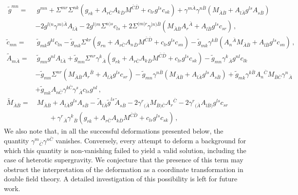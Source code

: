 \documentclass[12pt, utf8]{article}
\numberwithin{equation}{section}
\begin{document}
\begin{equation}  \label{deformation rules GDFT }
    \begin{aligned}
       \ \tilde{g}^{mn} =&\ g^{mn} + \Sigma^{mr} \Sigma^{nk} (g_{rk} + A_{r\bar{C}}A_k{}_{\bar{D}} M^{\bar{C}\bar{D}} +c_{lr}g^{ls}c_{sk} )  + \gamma^{m \bar{A}} \gamma^{n \bar{B}} (M_{\bar{A} \bar{B}} + A_{l \bar{A}} g^{ls}A_{s \bar{B}}) \\
        &  -  2 g^{l(n} \gamma^{m) \bar{A}} A_{l\bar{A}} - 2 g^{l(m} \Sigma^{n)s}c_{ls} + 2 \Sigma^{(m|r} \gamma^{|n)\bar{B}} (M_{\bar{A} \bar{B}} A_{r}{}^{\bar{A}} + A_{l\bar{B}} g^{ls}c_{sr}) \, ,\\
            \tilde{c}_{m n} =&\ \tilde{g}_{m k} g^{k l}c_{ln} - \tilde{g}_{m k} \Sigma^{k r} (g_{rn} + A_{r \bar{C}} A_n{}_{\bar{D}} M^{\bar{C}\bar{D}} + c_{lr}g^{ls}c_{sn}) - \tilde{g}_{m k} \gamma^{k \bar{B}} (A_n{}^{\bar{A}} M_{\bar{A} \bar{B}} +A_{l \bar{B}} g^{ls} c_{sn}) \, , \\     
            \tilde{A}_{m \bar{A}} =&\   \tilde{g}_{m n}  g^{n l}A_{l\bar{A}} +  \tilde{g}_{m n}  \Sigma^{nr} \gamma^{k}{}_{\bar{A}} (g_{rk}+A_{r \bar{C}} A_k{}_{\bar{D}} M^{\bar{C} \bar{D}} +c_{lr}g^{ls}c_{sk})  -  \tilde{g}_{m n}  \gamma^k{}_{\bar{A}}  g^{nl}c_{lk} \\ 
        &  -  \tilde{g}_{m n} \Sigma^{n r}(M_{\bar{A} \bar{B}} A_{r}{}^{ \bar{B}}  + A_{l \bar{A}}g^{ls}c_{sr}) -  \tilde{g}_{m n}  \gamma^{n\bar{B}} (M_{\bar{A} \bar{B}} + A_{l \bar{A} } g^{ls} A_{s \bar{B}}) + \tilde{g}_{m k} \gamma^{k \bar{B}} A_{n}{}^{\bar{C}} M_{\bar{B} \bar{C}} \gamma^{n}{}_{\bar{A}} \\ 
        &  + \tilde{g}_{m k} A_{n \bar{C}} \gamma^{k \bar{C}} \gamma^{s}{}_{\bar{A}} c_{l s} g^{n l}                     \, , \\
             \tilde{M}_{\bar{A} \bar{B}}  =&\   M_{\bar{A} \bar{B}}  + A_{l\bar{A}}g^{ls}A_{s\bar{B}} - \tilde{A}_{l\bar{A}}\tilde{g}^{ls}\tilde{A}_{s\bar{B}} - 2 \gamma^r{}_{(\bar{A}} M_{\bar{B}) \bar{C}}  A_{r}{}^{\bar{C}} - 2 \gamma^r{}_{(\bar{A}} A_{l \bar{B})}g^{ls}c_{sr} \\
        & \qquad  + \gamma^{r}{}_{\bar{A}}  \gamma^k{}_{\bar{B}} (g_{rk} + A_{r \bar{C}} A_{k \bar{D}} M^{\bar{C}\bar{D}} + c_{lr} g^{ls}c_{sk} )    \, ,
    \end{aligned}
\end{equation}
We also note that, in all the successful deformations presented below, the quantity $ \gamma^m{}_{\bar{C}} \gamma^{ n \bar{C}}$ vanishes. Conversely, every attempt to deform a background for which this quantity is non-vanishing failed to yield a valid solution, including the case of heterotic supergravity. We conjecture that the presence of this term may obstruct the interpretation of the deformation as a coordinate transformation in double field theory. A detailed investigation of this possibility is left for future work.
\end{document}
